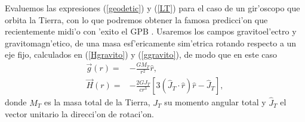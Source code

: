 Evaluemos las expresiones (\ref{geodetic}) y (\ref{LT}) para el caso de un gir'oscopo que orbita la Tierra, con lo que podremos obtener la famosa predicci'on que recientemente midi'o con 'exito el GPB \cite{Everitt11}. Usaremos los campos gravitoel'ectro y gravitomagn'etico, de una masa esf'ericamente sim'etrica rotando respecto a un eje fijo, calculados en (\ref{Hgravito}) y (\ref{ggravito}), de modo que en este caso
\begin{align}
\vec{g}(r)={}&-\frac{GM_T}{r^2}\hat{r},\label{gGPB}\\
\vec{H}(r)={}&-\frac{2GJ_T}{cr^3}\left[3(\hat{J}_T\cdot\hat{r})\hat{r}-\hat{J}_T\right]\label{BGPB},
\end{align}
donde $M_T$ es la masa total de la Tierra, $J_T$ su momento angular total y $\hat{J}_T$ el vector unitario la direcci'on de rotaci'on.

